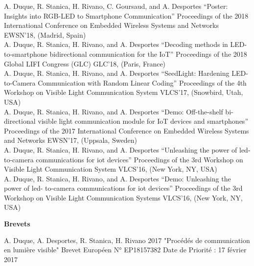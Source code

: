 \documentclass[]{cv-style}          %
\begin{document}
\normalsize
\begin{publist}
\pub
{A. Duque, R. Stanica, H. Rivano, C. Goursaud, and A. Desportes}
{“Poster: Insights into RGB-LED to Smartphone Communication”}
{Proceedings of the 2018 International Conference on Embedded Wireless Systems and Networks}
{EWSN’18, (Madrid, Spain)}\\
\pub
{A. Duque, R. Stanica, H. Rivano, and A. Desportes}
{“Decoding methods in LED-to-smartphone bidirectional communication for the IoT”}
{Proceedings of the 2018 Global LIFI Congress (GLC)}
{GLC’18, (Paris, France)}\\
\pub
{A. Duque, R. Stanica, H. Rivano, and A. Desportes}
{“SeedLight: Hardening LED-to-Camera Communication with Random Linear Coding”}
{Proceedings of the 4th Workshop on Visible Light Communication System}
{VLCS’17, (Snowbird, Utah, USA)}\\
\pub
{A. Duque, R. Stanica, H. Rivano, and A. Desportes}
{“Demo: Off-the-shelf bi-directional visible light communication module for IoT devices and smartphones”}
{Proceedings of the 2017 International Conference on Embedded Wireless Systems and Networks}
{EWSN’17, (Uppsala, Sweden)}\\
\pub
  {A. Duque, R. Stanica, H. Rivano, and A. Desportes}
  {“Unleashing the power of led- to-camera communications for iot devices”}
  {Proceedings of the 3rd Workshop on Visible Light Communication System}
  {VLCS’16, (New York, NY, USA)}\\
\pub
  {A. Duque, R. Stanica, H. Rivano, and A. Desportes} {“Demo: Unleashing the power of led- to-camera communications for iot devices”} {Proceedings of the 3rd Workshop on Visible Light Communication Systems} {VLCS’16, (New York, NY, USA)}
\end{publist}


\large{\textbf{Brevets}}

\normalsize
\begin{publist}
\pat
{A. Duque, A. Desportes,  R. Stanica, H. Rivano}
{2017}
{"Procédés de communication en lumière visible"}
{Brevet Européen N° EP18157382}
{Date de Priorité : 17 février 2017}
\\
\end{publist}


\end{document}
